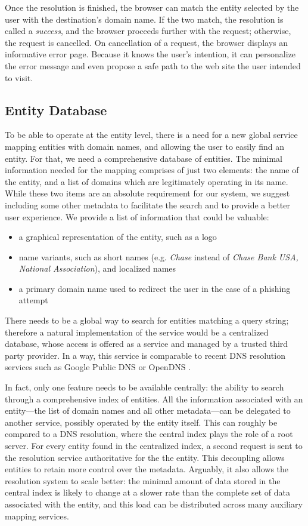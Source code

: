 \documentclass[11pt,styles/chicago]{article}
\begin{document}
Once the resolution is finished, the browser can match the entity selected by the user with the destination's domain name. If the two match, the resolution is called a \emph{success}, and the browser proceeds further with the request; otherwise, the request is cancelled. On cancellation of a request, the browser displays an informative error page. Because it knows the user's intention, it can personalize the error message and even propose a safe path to the web site the user intended to visit.

\subsection{Entity Database}

To be able to operate at the entity level, there is a need for a new global service mapping entities with domain names, and allowing the user to easily find an entity. For that, we need a comprehensive database of entities. The minimal information needed for the mapping comprises of just two elements: the name of the entity, and a list of domains which are legitimately operating in its name. While these two items are an absolute requirement for our system, we suggest including some other metadata to facilitate the search and to provide a better user experience. We provide a list of information that could be valuable:

\begin{itemize}
\item a graphical representation of the entity, such as a logo
\item name variants, such as short names (e.g. \emph{Chase} instead of \emph{Chase Bank USA, National Association}), and localized names
\item a primary domain name used to redirect the user in the case of a phishing attempt
\end{itemize}

There needs to be a global way to search for entities matching a query string; therefore a natural implementation of the service would be a centralized database, whose access is offered as a service and managed by a trusted third party provider. In a way, this service is comparable to recent DNS resolution services such as Google Public DNS \cite{googledns} or OpenDNS \cite{opendns}.

In fact, only one feature needs to be available centrally: the ability to search through a comprehensive index of entities. All the information associated with an entity---the list of domain names and all other metadata---can be delegated to another service, possibly operated by the entity itself. This can roughly be compared to a DNS resolution, where the central index plays the role of a root server. For every entity found in the centralized index, a second request is sent to the resolution service authoritative for the the entity. This decoupling allows entities to retain more control over the metadata. Arguably, it also allows the resolution system to scale better: the minimal amount of data stored in the central index is likely to change at a slower rate than the complete set of data associated with the entity, and this load can be distributed across many auxiliary mapping services.
\end{document}
